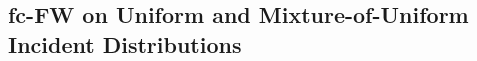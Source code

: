 \documentclass[stsy,sglanonrev]{informs4}
\begin{document}

\subsection{fc-FW on Uniform and Mixture-of-Uniform Incident Distributions}
\end{document}
